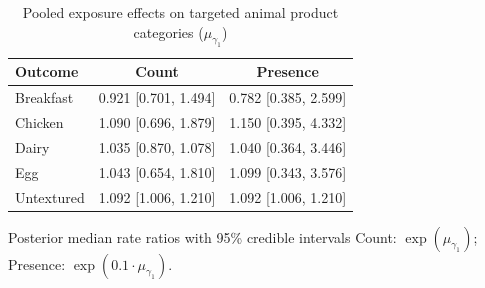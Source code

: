 \begin{table}[H]
\centering
\caption{Pooled exposure effects on targeted animal product categories ($\mu_{\gamma_1}$)}
\label{tab:a2_mu_gamma}
\begin{tabular}{lcc}
\toprule
Outcome & Count & Presence \\
\midrule
Breakfast & 0.921 [0.701, 1.494] & 0.782 [0.385, 2.599] \\
Chicken & 1.090 [0.696, 1.879] & 1.150 [0.395, 4.332] \\
Dairy & 1.035 [0.870, 1.078] & 1.040 [0.364, 3.446] \\
Egg & 1.043 [0.654, 1.810] & 1.099 [0.343, 3.576] \\
Untextured & 1.092 [1.006, 1.210] & 1.092 [1.006, 1.210] \\
\bottomrule
\end{tabular}
\par\smallskip\footnotesize Posterior median rate ratios with 95\% credible intervals Count: $\exp(\mu_{\gamma_1})$; Presence: $\exp(0.1 \cdot \mu_{\gamma_1})$.
\end{table}
